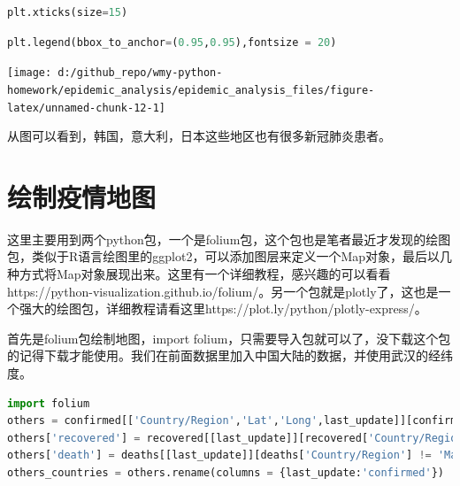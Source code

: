 \documentclass[UTF8,a4paper,12pt]{ctexart}  %
\begin{document}
\begin{lstlisting}[language=Python]
plt.xticks(size=15)
\end{lstlisting}

\begin{lstlisting}[language=Python]
plt.legend(bbox_to_anchor=(0.95,0.95),fontsize = 20)
\end{lstlisting}

\begin{center}\texttt{[image: d:/github\_repo/wmy-python-homework/epidemic\_analysis/epidemic\_analysis\_files/figure-latex/unnamed-chunk-12-1]} \end{center}

从图可以看到，韩国，意大利，日本这些地区也有很多新冠肺炎患者。

\section{绘制疫情地图}

这里主要用到两个python包，一个是folium包，这个包也是笔者最近才发现的绘图包，类似于R语言绘图里的ggplot2，可以添加图层来定义一个Map对象，最后以几种方式将Map对象展现出来。这里有一个详细教程，感兴趣的可以看看https://python-visualization.github.io/folium/。另一个包就是plotly了，这也是一个强大的绘图包，详细教程请看这里https://plot.ly/python/plotly-express/。

首先是folium包绘制地图，import folium，只需要导入包就可以了，没下载这个包的记得下载才能使用。我们在前面数据里加入中国大陆的数据，并使用武汉的经纬度。

\begin{lstlisting}[language=Python]
import folium
others = confirmed[['Country/Region','Lat','Long',last_update]][confirmed['Country/Region'] != 'Mainland China']
others['recovered'] = recovered[[last_update]][recovered['Country/Region'] != 'Mainland China']
others['death'] = deaths[[last_update]][deaths['Country/Region'] != 'Mainland China']
others_countries = others.rename(columns = {last_update:'confirmed'})
\end{lstlisting}
\end{document}
